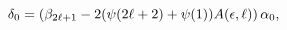 $\delta_{0}=\left(\beta_{2\ell+1}-2(\mathop{\psi\/}\nolimits\!\left(2\ell+2%
\right)+\mathop{\psi\/}\nolimits\!\left(1\right))A(\epsilon,\ell)\right)\alpha%
_{0},$